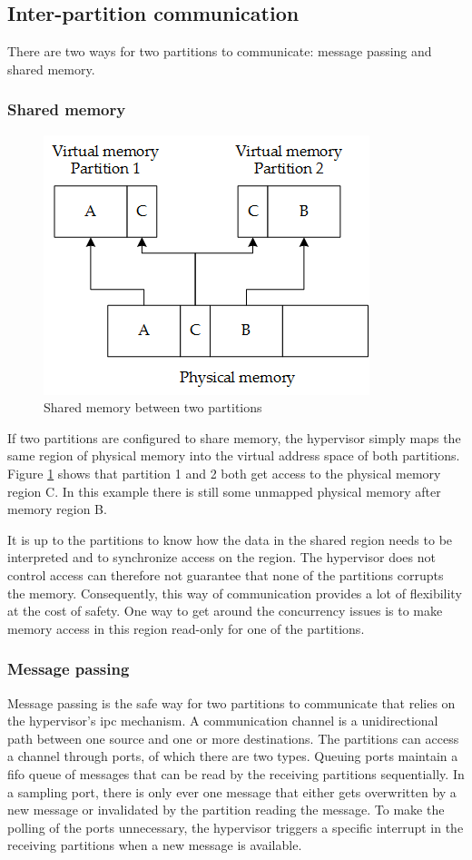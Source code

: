 \subsection{Inter-partition communication}
There are two ways for two partitions to communicate: message passing and shared memory.

\subsubsection{Shared memory}
\begin{figure}[hbt!]
\centering
\includegraphics[scale=0.75]{Figures/shared_memory.png}
\decoRule
\caption{Shared memory between two partitions}
\label{fig:shared_memory}
\end{figure}
If two partitions are configured to share memory, the hypervisor simply maps the same region of physical memory into the virtual address space of both partitions. Figure \ref{fig:shared_memory} shows that partition 1 and 2 both get access to the physical memory region C. In this example there is still some unmapped physical memory after memory region B. 

It is up to the partitions to know how the data in the shared region needs to be interpreted and to synchronize access on the region. The hypervisor does not control access can therefore not guarantee that none of the partitions corrupts the memory. Consequently, this way of communication provides a lot of flexibility at the cost of safety.
One way to get around the concurrency issues is to make memory access in this region read-only for one of the partitions.

\subsubsection{Message passing}
Message passing is the safe way for two partitions to communicate that relies on the hypervisor's \acrshort{ipc} mechanism. A communication channel is a unidirectional path between one source and one or more destinations. The partitions can access a channel through ports, of which there are two types. Queuing ports maintain a \acrshort{fifo} queue of messages that can be read by the receiving partitions sequentially. In a sampling port, there is only ever one message that either gets overwritten by a new message or invalidated by the partition reading the message. To make the polling of the ports unnecessary, the hypervisor triggers a specific interrupt in the receiving partitions when a new message is available.

